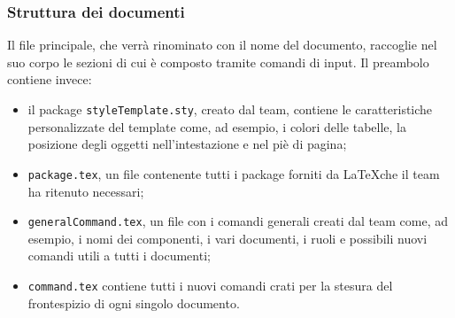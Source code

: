 \subsubsection{Struttura dei documenti}
Il file principale, che verrà rinominato con il nome del documento, raccoglie nel suo corpo le sezioni di cui è composto tramite comandi di input. Il preambolo contiene invece:
\begin{itemize}
	\item il package \texttt{styleTemplate.sty}, creato dal team, contiene le caratteristiche personalizzate del template come, ad esempio, i colori delle tabelle, la posizione degli oggetti nell'intestazione e nel piè di pagina;
	\item \texttt{package.tex}, un file contenente tutti i package forniti da \LaTeX che il team ha ritenuto necessari;
	\item \texttt{generalCommand.tex}, un file con i comandi generali creati dal team come, ad esempio, i nomi dei componenti, i vari documenti, i ruoli e possibili nuovi comandi utili a tutti i documenti;
	\item \texttt{command.tex} contiene tutti i nuovi comandi crati per la stesura del frontespizio di ogni singolo documento.
\end{itemize}

